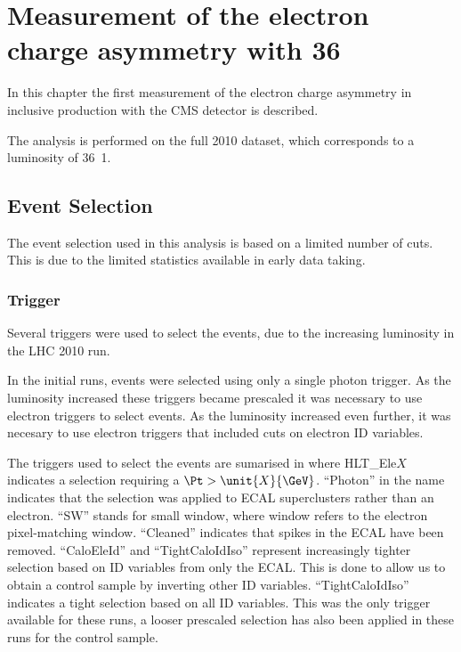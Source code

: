 \chapter{ 
Measurement of the electron charge asymmetry with \unit{36}{\invpb} }

In this chapter the first measurement of the electron charge asymmetry in
inclusive \inclusiveWe production with the \ac{CMS} detector is described.

The analysis is performed on the full 2010 dataset, which corresponds to a
luminosity of \unit{36.1}{\invpb}.

\section{Event Selection}

The event selection used in this analysis is based on a limited number of cuts.
This is due to the limited statistics available in early data taking.

\subsection{Trigger}

\label{asym36:triggerdef}
Several triggers were used to select the events, due to the increasing
luminosity in the \ac{LHC} 2010 run.

In the initial runs, events were selected using only a single photon trigger. 
As the luminosity increased these triggers became prescaled it was
necessary to use electron triggers to select events. 
As the luminosity increased even further, it was necesary to use electron
triggers that included cuts on electron ID variables.

The triggers used to select the events are sumarised in 
where HLT\_Ele$X$ indicates a selection requiring a $\Pt > \unit{X}{\GeV}$. 
``Photon'' in the name indicates that the selection was applied to ECAL
superclusters rather than an electron. 
``SW'' stands for small window, where window refers to the electron
pixel-matching window. 
 ``Cleaned'' indicates that spikes in the \ac{ECAL} have been removed. 
``CaloEleId'' and ``TightCaloIdIso'' represent increasingly tighter selection
based on ID variables from only the \ac{ECAL}.  This is done to allow us to
obtain a control sample by inverting other ID variables.
``TightCaloIdIso'' indicates a tight selection based on all ID variables. 
This was the only trigger available for these runs, a looser prescaled
selection has also been applied in these runs for the control sample.

